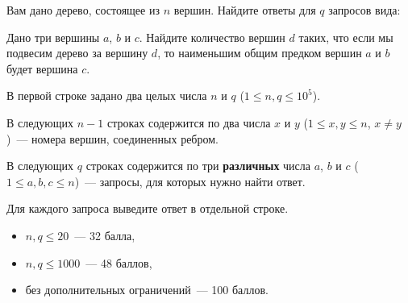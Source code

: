 
\Legend
Вам дано дерево, состоящее из $n$ вершин. Найдите ответы для $q$ запросов вида:

Дано три вершины $a$, $b$ и $c$. Найдите количество вершин $d$ таких, что если мы подвесим дерево за вершину $d$, то наименьшим общим предком
вершин $a$ и $b$ будет вершина $c$.

\Input
В первой строке задано два целых числа $n$ и $q$ ($1 \le n, q \le 10^5$).

В следующих $n - 1$ строках содержится по два числа $x$ и $y$ ($1 \le x, y \le n$, $x \ne y$)~--- номера вершин, соединенных ребром.

В следующих $q$ строках содержится по три \textbf{различных} числа $a$, $b$ и $c$ ($1 \le a, b, c \le n$)~--- запросы, для которых нужно найти ответ.

\Output
Для каждого запроса выведите ответ в отдельной строке.

\Samples
\BeginTests
\EndTests

\Scoring
\begin{itemize}
	\item $n, q \le 20$~--- 32 балла,
	\item $n, q \le 1000$~--- 48 баллов,
	\item без дополнительных ограничений~--- 100 баллов.
\end{itemize}

\EndProblem
